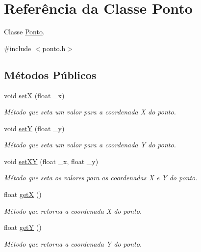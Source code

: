 \hypertarget{classPonto}{}\section{Referência da Classe Ponto}
\label{classPonto}


Classe \hyperlink{classPonto}{Ponto}.  




{\ttfamily \#include $<$ponto.\+h$>$}

\subsection*{Métodos Públicos}
\begin{DoxyCompactItemize}
\item 
void \hyperlink{classPonto_a22129ad4dbf8019c479021d70a9f6774}{setX} (float \+\_\+x)
\begin{DoxyCompactList}\small\item\em Método que seta um valor para a coordenada X do ponto. \end{DoxyCompactList}\item 
void \hyperlink{classPonto_a2d9e5b9fade9d3f3f21122a2dc2f5e11}{setY} (float \+\_\+y)
\begin{DoxyCompactList}\small\item\em Método que seta um valor para a coordenada Y do ponto. \end{DoxyCompactList}\item 
void \hyperlink{classPonto_a827488219a7da184d440f687cec49ce6}{set\+XY} (float \+\_\+x, float \+\_\+y)
\begin{DoxyCompactList}\small\item\em Método que seta os valores para as coordenadas X e Y do ponto. \end{DoxyCompactList}\item 
float \hyperlink{classPonto_ae4823d6ee26ff3448ee403d26a3c6d2f}{getX} ()
\begin{DoxyCompactList}\small\item\em Método que retorna a coordenada X do ponto. \end{DoxyCompactList}\item 
float \hyperlink{classPonto_ab120600953e6544301223b9b05a43ee5}{getY} ()
\begin{DoxyCompactList}\small\item\em Método que retorna a coordenada Y do ponto. \end{DoxyCompactList}\item 

\end{DoxyCompactItemize}
